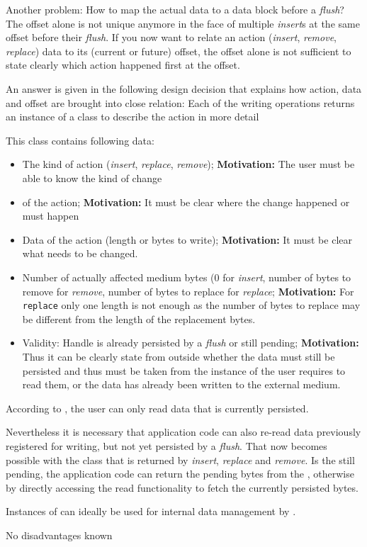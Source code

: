 Another problem: How to map the actual data to a data block before a \emph{flush}? The offset alone is not unique anymore in the face of multiple \emph{insert}s at the same offset before their \emph{flush}. If you now want to relate an action (\emph{insert}, \emph{remove}, \emph{replace}) data to its (current or future) offset, the offset alone is not sufficient to state clearly which action happened first at the offset.

An answer is given in the following design decision that explains how action, data and offset are brought into close relation:
{%
Each of the writing operations returns an instance of a class \MediumAction{} to describe the action in more detail
}
{%
This class contains following data:
\begin{itemize}
\item The kind of action (\emph{insert}, \emph{replace}, \emph{remove}); \textbf{Motivation:} The user must be able to know the kind of change
\item \IMediumReference{} of the action; \textbf{Motivation:} It must be clear where the change happened or must happen
\item Data of the action (length or bytes to write); \textbf{Motivation:} It must be clear what needs to be changed.
\item Number of actually affected medium bytes (0 for \emph{insert}, number of bytes to remove for \emph{remove}, number of bytes to replace for \emph{replace}; \textbf{Motivation:} For \texttt{replace} only one length is not enough as the number of bytes to replace may be different from the length of the replacement bytes.
\item Validity: Handle is already persisted by a \emph{flush} or still pending; \textbf{Motivation:} Thus it can be clearly state from outside whether the data must still be persisted and thus must be taken from the instance of the user requires to read them, or the data has already been written to the external medium.
\end{itemize}
}
{%
According to , the user can only read data that is currently persisted.

Nevertheless it is necessary that application code can also re-read data previously registered for writing, but not yet persisted by a \emph{flush}. That now becomes possible with the \MediumAction{} class that is returned by \emph{insert}, \emph{replace} and \emph{remove}. Is the \MediumAction{} still pending, the application code can return the pending bytes from the \MediumAction{}, otherwise by directly accessing the  \COMPmedia{} read functionality to fetch the currently persisted bytes.

Instances of \MediumAction{} can ideally be used for internal data management by \COMPmedia{}.
}
{%
No disadvantages known
}

